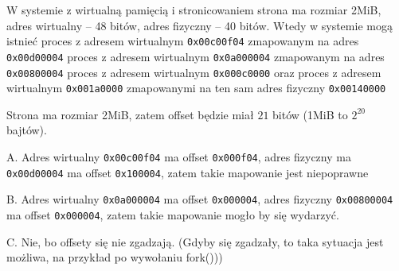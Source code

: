 \begin{exam}
    W systemie z wirtualną pamięcią i stronicowaniem strona ma rozmiar 2MiB, adres wirtualny -- 48 bitów, adres fizyczny -- 40 bitów. Wtedy w systemie mogą istnieć
    \answers
    {proces z adresem wirtualnym \texttt{0x00c00f04} zmapowanym na adres \texttt{0x00d00004}}
    {proces z adresem wirtualnym \texttt{0x0a000004} zmapowanym na adres \texttt{0x00800004}}
    {proces z adresem wirtualnym \texttt{0x000c0000} oraz proces z adresem wirtualnym \texttt{0x001a0000} zmapowanymi na ten sam adres fizyczny \texttt{0x00140000}}

    Strona ma rozmiar 2MiB, zatem offset będzie miał $21$ bitów (1MiB to $2^{20}$ bajtów).

    A. Adres wirtualny \texttt{0x00c00f04} ma offset \texttt{0x000f04}, adres fizyczny ma \texttt{0x00d00004} ma offset \texttt{0x100004}, zatem takie mapowanie jest niepoprawne

    B. Adres wirtualny \texttt{0x0a000004} ma offset \texttt{0x000004}, adres fizyczny \texttt{0x00800004} ma offset \texttt{0x000004}, zatem takie mapowanie mogło by się wydarzyć.

    C. Nie, bo offsety się nie zgadzają. (Gdyby się zgadzały, to
    taka sytuacja jest możliwa, na przykład po wywołaniu {\ttfamily fork()}))
\end{exam}


